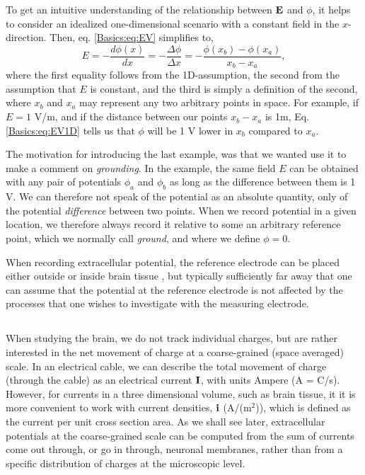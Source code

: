 To get an intuitive understanding of the relationship between ${\bf E}$ and $\phi$, it helps to consider an idealized one-dimensional scenario with a constant field in the $x$-direction. Then, eq. \ref{Basics:eq:EV} simplifies to,
\begin{equation}
E = -\frac{d\phi(x)}{dx} = -\frac{\Delta \phi}{\Delta x} = -\frac{\phi(x_b)-\phi(x_a)}{x_b-x_a},
\label{Basics:eq:EV1D}
\end{equation}
where the first equality follows from the 1D-assumption, the second from the assumption that $E$ is constant, and the third is simply a definition of the second, where $x_b$ and $x_a$ may represent any two arbitrary points in space. For example, if $E = 1$ V/m, and if the distance between our points $x_b-x_a$ is 1m, Eq. \ref{Basics:eq:EV1D} tells us that $\phi$ will be 1 V  lower in $x_b$ compared to $x_a$.

The motivation for introducing the last example, was that we wanted use it to make a comment on \textit{grounding}. In the example, the same field $E$ can be obtained with any pair of potentials $\phi_a$ and $\phi_b$ as long as the difference between them is 1 V. We can therefore not speak of the potential as an absolute quantity, only of the potential \textit{difference} between two points. When we record potential in a given location, we therefore always record it relative to some an arbitrary reference point, which we normally call \textit{ground}, and where we define $\phi = 0$. 

When recording extracellular potential, the reference electrode can be placed either outside or inside brain tissue \cite{Sharott2015}, but typically sufficiently far away that one can assume that the potential at the reference electrode is not affected by the processes that one wishes to investigate with the measuring electrode. 


\subsection{}
When studying the brain, we do not track individual charges, but are rather interested in the net movement of charge at a coarse-grained (space averaged) scale. In an electrical cable, we can
describe the total movement of charge (through the cable) as an electrical current ${\bf I}$, with units Ampere (A = C/s). However, for currents in a three dimensional volume, such as brain tissue, it 
it is more convenient to work with current densities, ${\bf i}$ (A/(m$^2$)), which is defined as the current per unit cross section area. As we shall see later, extracellular potentials at the coarse-grained scale can be computed from the sum of currents come out through, or go in through, neuronal membranes, rather than from a specific distribution of charges at the microscopic level.

